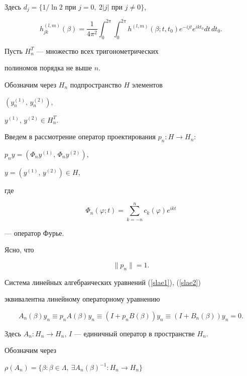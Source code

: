 Здесь $d_j=\{1/\ln 2\text{ при }j=0,\ 2|j|\text{ при }j \ne 0 \}$,


$$


h_{jk}^{(l,m)}(\beta)=\frac{1}{4\pi^2}


\int_0^{2\pi}\int_0^{2\pi}h^{(l,m)}(\beta;t,t_0)e^{-ijt}e^{ikt_0}dt\,dt_0.


$$





Пусть $H_n^T$ --- множество всех тригонометрических


полиномов порядка не выше $n$. 


Обозначим через $H_n$ подпространство $H$ элементов


$(y_n^{(1)},\,y_n^{(2)})$,


$y^{(1)},\, y^{(2)}\in H_n^T$.


Введем в рассмотрение оператор проектирования $p_n: H\to H_n$:


$p_ny=(\Phi_n y^{(1)},\, \Phi_n y^{(2)})$,


$y=(y^{(1)},\,y^{(2)}) \in H$,


где


$$


\Phi_n(\varphi;t)=\sum_{k=-n}^n c_k(\varphi)e^{ikt}


$$


--- оператор Фурье.


Ясно, что 


\begin{equation}


\label{normpn}


\|p_n\|=1.


\end{equation}


Система линейных алгебраических уравнений (\ref{slae1}), (\ref{slae2})


эквивалентна линейному операторному уравнению


$$


A_n(\beta)y_n\equiv p_nA(\beta)y_n\equiv 


(I+p_nB(\beta))y_n\equiv (I+B_n(\beta))y_n=0.


$$


Здесь $A_n: H_n \to H_n$, $I$ --- единичный оператор в пространстве $H_n$.





Обозначим через


$\rho(A_n)=\{\beta:\beta\in \Lambda,\ \exists A_n(\beta)^{-1}:H_n\to H_n\}$


